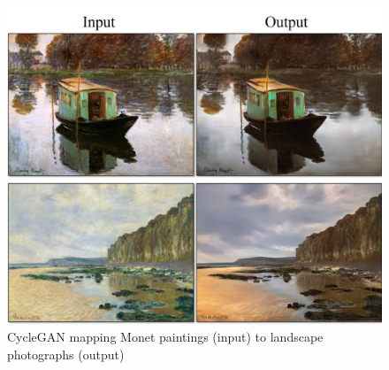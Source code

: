     \begin{figure}[h]
        \caption{CycleGAN mapping Monet paintings (input) to landscape photographs (output)
        \cite{cycleganprojectpage}}
        \centering
        \includegraphics[width=0.6\linewidth]{images/painting2photo.jpg}
    \end{figure} 